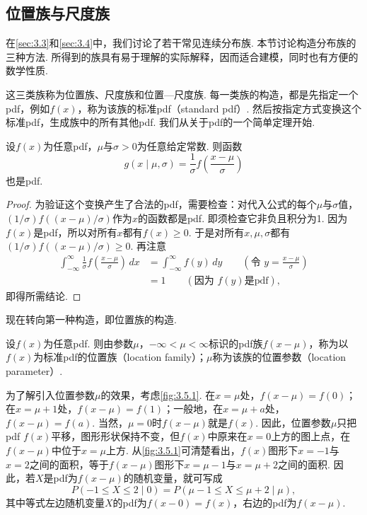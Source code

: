 \subsection{位置族与尺度族}\label{sec:3.5}
在\autoref{sec:3.3}和\autoref{sec:3.4}中，我们讨论了若干常见连续分布族. 本节讨论构造分布族的三种方法. 所得到的族具有易于理解的实际解释，因而适合建模，同时也有方便的数学性质.

这三类族称为位置族、尺度族和位置—尺度族. 每一类族的构造，都是先指定一个pdf，例如$f(x)$，称为该族的标准pdf（standard pdf）. 然后按指定方式变换这个标准pdf，生成族中的所有其他pdf. 我们从关于pdf的一个简单定理开始.

\begin{theorem}\label{thm:3.5.1}
设$f(x)$为任意pdf，$\mu$与$\sigma>0$为任意给定常数. 则函数
$$g(x\mid\mu,\sigma)=\frac1\sigma f\left(\frac{x-\mu}\sigma\right)$$
也是pdf.
\end{theorem}
\begin{proof}
为验证这个变换产生了合法的pdf，需要检查：对代入公式的每个$\mu$与$\sigma$值，$(1/\sigma)f((x-\mu)/\sigma)$作为$x$的函数都是pdf. 即须检查它非负且积分为1. 因为$f(x)$是pdf，所以对所有$x$都有$f(x)\ge0$. 于是对所有$x,\mu,\sigma$都有$(1/\sigma)f((x-\mu)/\sigma)\ge0$. 再注意
\begin{align*}
\int_{-\infty}^\infty\frac1\sigma f\left(\frac{x-\mu}\sigma\right)\,dx
&=\int_{-\infty}^\infty f(y)\,dy\qquad\left(\text{令 }y=\frac{x-\mu}\sigma\right)\\
&=1\qquad(\text{因为 }f(y)\text{是pdf}),
\end{align*}
即得所需结论.
\end{proof}
现在转向第一种构造，即位置族的构造.

\begin{definition}\label{def:3.5.2}
设$f(x)$为任意pdf. 则由参数$\mu$，$-\infty<\mu<\infty$标识的pdf族$f(x-\mu)$，称为以$f(x)$为标准pdf的位置族（location family）；$\mu$称为该族的位置参数（location parameter）.
\end{definition}
为了解引入位置参数$\mu$的效果，考虑\autoref{fig:3.5.1}. 在$x=\mu$处，$f(x-\mu)=f(0)$；在$x=\mu+1$处，$f(x-\mu)=f(1)$；一般地，在$x=\mu+a$处，$f(x-\mu)=f(a)$. 当然，$\mu=0$时$f(x-\mu)$就是$f(x)$. 因此，位置参数$\mu$只把pdf $f(x)$平移，图形形状保持不变，但$f(x)$中原来在$x=0$上方的图上点，在$f(x-\mu)$中位于$x=\mu$上方. 从\autoref{fig:3.5.1}可清楚看出，$f(x)$图形下$x=-1$与$x=2$之间的面积，等于$f(x-\mu)$图形下$x=\mu-1$与$x=\mu+2$之间的面积. 因此，若$X$是pdf为$f(x-\mu)$的随机变量，就可写成
$$P(-1\le X\le2\mid0)=P(\mu-1\le X\le\mu+2\mid\mu),$$
其中等式左边随机变量$X$的pdf为$f(x-0)=f(x)$，右边的pdf为$f(x-\mu)$.

